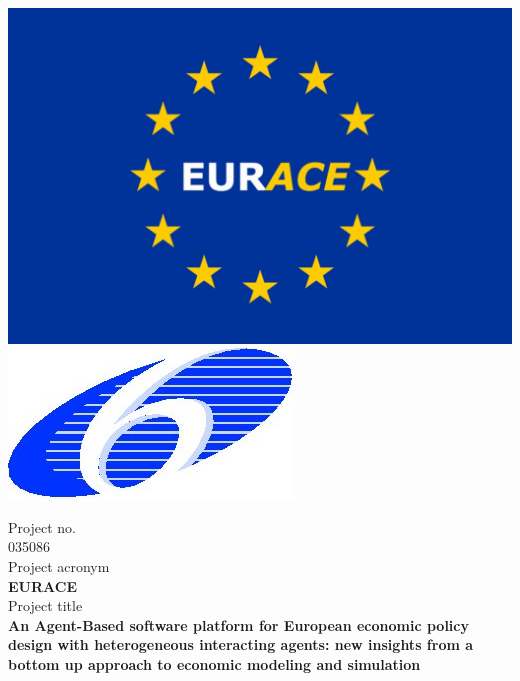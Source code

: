\documentclass[urop]{socreport}
\begin{document}
\newcommand{\screenshot}[1]{\texttt{[image: screenshots/\#1.jpg]}}
\newcommand{\graphic}[1]{\texttt{[image: graphics/\#1.jpg]}}
\newcommand{\example}[1]{``{\tt #1}''}

\thispagestyle{empty}

\begin{center}
\includegraphics[scale=0.1]{./graphics/EURACE-Flag.jpg} \hfill
\includegraphics[scale=0.5]{./graphics/6fp.jpg}

\end{center}


\begin{center}
Project no.\\
035086\\
Project acronym \\
\textbf{EURACE}\\
Project title\\ 
\small{\textbf{An Agent-Based software platform for European economic policy design with heterogeneous interacting agents: new insights from a bottom up approach to economic modeling and simulation}}\\
\end{center}
\end{document}
